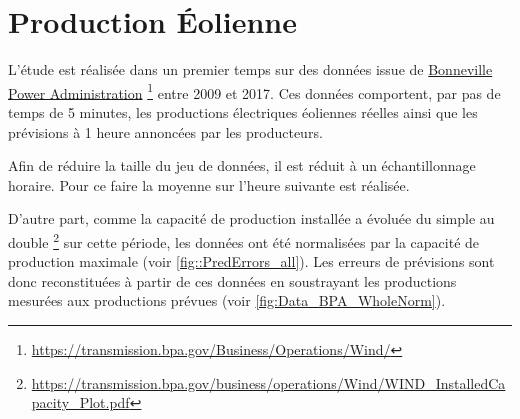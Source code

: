 \documentclass[12pt, french]{report}
\begin{document}
\section{Production Éolienne}
\label{sec:Data_Wind}
L'étude est réalisée dans un premier temps sur des données issue de \href{https://transmission.bpa.gov/Business/Operations/Wind/}{Bonneville Power Administration}  \footnote{\url{https://transmission.bpa.gov/Business/Operations/Wind/}} entre 2009 et 2017. Ces données comportent, par pas de temps de 5 minutes, les productions électriques éoliennes réelles ainsi que les prévisions à 1 heure annoncées par les producteurs.

Afin de réduire la taille du jeu de données, il est réduit à un échantillonnage horaire. Pour ce faire la moyenne sur l'heure suivante est réalisée.

D'autre part, comme la capacité de production installée a évoluée du simple au double  \footnote{\url{https://transmission.bpa.gov/business/operations/Wind/WIND_InstalledCapacity_Plot.pdf}} sur cette période, les données ont été normalisées par la capacité de production maximale (voir \ref{fig::PredErrors_all}). Les erreurs de prévisions sont donc reconstituées à partir de ces données en soustrayant les productions mesurées aux productions prévues (voir \ref{fig:Data_BPA_WholeNorm}).
\end{document}
